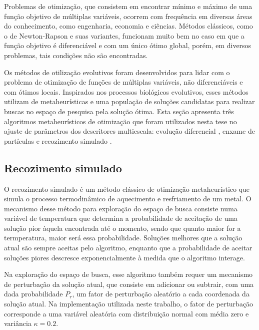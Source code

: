 Problemas de otimização, que consistem em encontrar mínimo e máximo de uma função objetivo de múltiplas variáveis, ocorrem com frequência em diversas áreas do conhecimento, como engenharia, economia e ciências. Métodos clássicos, como o de Newton-Rapson e suas variantes, funcionam muito bem no caso em que a função objetivo é diferenciável e com um único ótimo global, porém, em diversos problemas, tais condições não são encontradas. 

Os métodos de otilização evolutivos foram desenvolvidos para lidar com o problema de otimização de funções de múltiplas  variáveis, não diferenciáveis e com ótimos locais. Inspirados nos processos biológicos evolutivos, esses métodos utilizam de metaheurísticas e uma população de soluções candidatas para realizar buscas no espaço de pesquisa pela solução ótima. Esta seção apresenta três algoritmos metaheurísticos de otimização que foram utilizados nesta tese no ajuste de parâmetros dos descritores multiescala: evolução diferencial  \cite{Storn:1007}, enxame de partículas  \cite{Yuhui:1998} e recozimento simulado \cite{Andries:2007}.

\subsection{Recozimento simulado}

O  recozimento simulado é um método clássico de otimização metaheurístico que simula o processo termodinâmico de aquecimento e resfriamento de um metal. O mecanismo desse método para exploração do espaço de busca consiste numa variável de temperatura que determina a probabilidade de aceitação de uma solução pior àquela encontrada até o momento, sendo que quanto maior for a termperatura, maior será essa probabilidade. Soluções melhores que a solução atual são sempre aceitas pelo algoritmo, enquanto que a probabilidade de aceitar soluções piores descresce exponencialmente à medida que o algoritmo interage.  

Na exploração do espaço de busca, esse algoritmo também requer um mecanismo de perturbação da solução atual, que consiste em adicionar ou subtrair, com uma dada probabilidade $P_r$, um fator de perturbação aleatório a cada coordenada da solução atual. Na implementação utilizada neste trabalho, o fator de perturbação corresponde a uma variável aleatória com distribuição normal com média zero e variância $\kappa = 0.2$.

